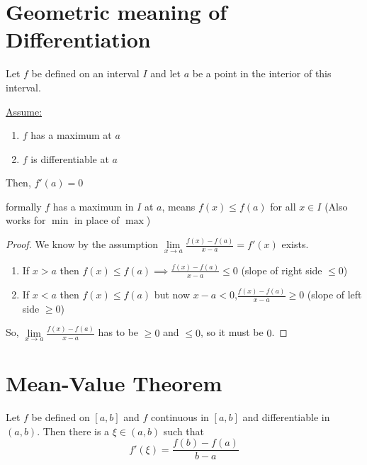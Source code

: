 \section{Geometric meaning of Differentiation}

\begin{theorem*}
  Let $f$ be defined on an interval $I$ and let $a$ be a point in the interior of this interval.

  \underline{Assume:}
  \begin{enumerate}
    \item $f$ has a maximum at $a$
    \item $f$ is differentiable at $a$
  \end{enumerate}
  Then, $f'(a) = 0$ 
  
  formally $f$ has a maximum in $I$ at $a$, means $f(x) \leq f(a)$ for all $x \in I$
  (Also works for $\min$ in place of $\max$)
\end{theorem*}

\begin{proof}
  We know by the assumption $\lim\limits_{x\to a} \frac{f(x) - f(a)}{x - a} = f'(x)$ exists.

  \begin{enumerate}
    \item If $x > a$ then $f(x) \leq f(a) \implies \frac{f(x) - f(a)}{x - a} \leq 0$ (slope of right side $\leq 0$)
    \item If $x < a$ then $f(x) \leq f(a)$ but now $x - a < 0$,$ \frac{f(x) - f(a)}{x - a} \geq 0$ (slope of left side $\geq 0$)
  \end{enumerate}

  So, $\lim\limits_{x\to a} \frac{f(x) - f(a)}{x - a}$ has to be $\geq 0$ and $\leq 0$, so it must be $0$.

\end{proof}

\section{Mean-Value Theorem}

\begin{theorem*}
  Let $f$ be defined on $\left[a, b\right]$ and $f$ continuous in $\left[a, b\right]$ and differentiable in $(a, b)$. 
  Then there is a $\xi \in (a, b)$ such that $$f'(\xi) = \frac{f(b) - f(a)}{b-a}$$
\end{theorem*}

